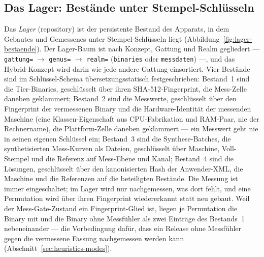 \begin{nurlang}
\subsection{Das Lager: Bestände unter Stempel-Schlüsseln}\label{sec:lager}
Das \emph{Lager} (repository) ist der persistente Bestand des Apparats, in dem Gebautes und Gemessenes
unter Stempel-Schlüsseln liegt (Abbildung~\ref{fig:lager-bestaende}). Der Lager-Baum ist nach Konzept,
Gattung und Realm gegliedert --- \texttt{gattung=} $\to$ \texttt{genus=} $\to$ \texttt{realm=}
(\texttt{binaries} oder \texttt{messdaten}) ---, und das Hybrid-Konzept wird darin wie jede andere
Gattung einsortiert. Vier Bestände sind im Schlüssel-Schema übersetzungsstatisch festgeschrieben:
Bestand~1 sind die Tier-Binaries, geschlüsselt über ihren SHA-512-Fingerprint, die Mess-Zelle daneben
geklammert; Bestand~2 sind die Messwerte, geschlüsselt über den Fingerprint der vermessenen Binary und
die Hardware-Identität der messenden Maschine (eine Klassen-Eigenschaft aus CPU-Fabrikation und
RAM-Paar, nie der Rechnername), die Plattform-Zelle daneben geklammert --- ein Messwert geht nie in
seinen eigenen Schlüssel ein; Bestand~3 sind die Synthese-Batches, die synthetisierten Mess-Kurven als
Dateien, geschlüsselt über Maschine, Voll-Stempel und die Referenz auf Mess-Ebene und Kanal; Bestand~4
sind die Lösungen, geschlüsselt über den kanonisierten Hash der Anwender-XML, die Maschine und die
Referenzen auf die beteiligten Bestände. Die Messung ist immer eingeschaltet; im Lager wird nur
nachgemessen, was dort fehlt, und eine Permutation wird über ihren Fingerprint wiedererkannt statt neu
gebaut. Weil der Mess-Gate-Zustand ein Fingerprint-Glied ist, liegen je Permutation die Binary mit und
die Binary ohne Messfühler als zwei Einträge des Bestands~1 nebeneinander --- die Vorbedingung dafür,
dass ein Release ohne Messfühler gegen die vermessene Fassung nachgemessen werden kann
(Abschnitt~\ref{sec:heuristics-modes}).


\end{nurlang}
